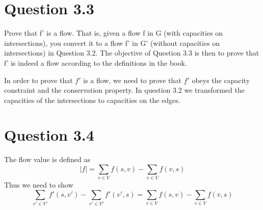 \documentclass[10pt]{article}
\begin{document}

\section*{Question 3.3} %
\label{sec:question_3_3}
Prove that f' is a flow. That is, given a flow f in G (with capacities on intersections), you convert it to a flow f' in G' (without capacities on intersections) in Question 3.2. The objective of Question 3.3 is then to prove that f' is indeed a flow according to the definitions in the book.

In order to prove that $f'$ is a flow, we need to prove that $f'$ obeys the capacity constraint and the conservation property. In question 3.2 we transformed the capacities of the intersections to capacities on the edges. 


\section*{Question 3.4} %
\label{sec:question_3_4}
The flow value is defined as
\begin{equation}
 |f| = \sum_{v \in V} f(s,v) - \sum_{v \in V} f(v,s)
\end{equation}
Thus we need to show
\begin{equation}
  \sum_{v' \in V'} f'(s,v') - \sum_{v' \in V'} f'(v',s) =   \sum_{v \in V} f(s,v) - \sum_{v \in V} f(v,s)
\end{equation}

% 



\appendix
\end{document}
